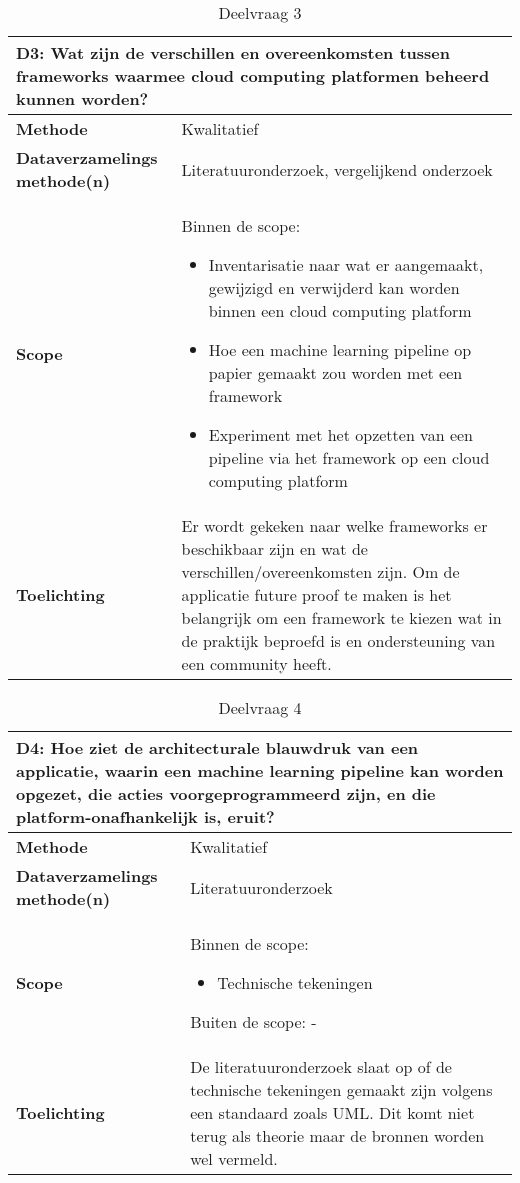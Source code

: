 {\begin{table}[hbt!]
\centering
\begin{tabular}{|p{.215\linewidth}|p{.72\linewidth}|}
\hline
\multicolumn{2}{|p{.97\linewidth}|}{\textbf{D3: Wat zijn de verschillen en overeenkomsten tussen frameworks waarmee cloud computing platformen beheerd kunnen worden?}} \\ \hline
  \textbf{Methode}&
    Kwalitatief
  \\ \hline
  \textbf{Dataverzamelings methode(n)}&
    Literatuuronderzoek, vergelijkend onderzoek
  \\ \hline
  \textbf{Scope}&
    Binnen de scope:
    \begin{itemize}
      \item Inventarisatie naar wat er aangemaakt, gewijzigd en verwijderd kan worden binnen een cloud computing platform
      \item Hoe een machine learning pipeline op papier gemaakt zou worden met een framework
      \item Experiment met het opzetten van een pipeline via het framework op een cloud computing platform
    \end{itemize}
  \\ \hline
  \textbf{Toelichting}&
  Er wordt gekeken naar welke frameworks er beschikbaar zijn en wat de verschillen/overeenkomsten zijn. Om de applicatie future proof te maken is het belangrijk om een framework te kiezen wat in de praktijk beproefd is en ondersteuning van een community heeft.
  \\ \hline
\end{tabular}
\caption{Deelvraag 3}
\label{table:sq3}
\end{table}

\space
\newpage

\begin{table}[hbt!]
\centering
\begin{tabular}{|p{.215\linewidth}|p{.72\linewidth}|}
\hline
\multicolumn{2}{|p{.97\linewidth}|}{\textbf{D4: Hoe ziet de architecturale blauwdruk van een applicatie, waarin een machine learning pipeline kan worden opgezet, die acties voorgeprogrammeerd zijn, en die platform-onafhankelijk is, eruit?}} \\ \hline
  \textbf{Methode}&
    Kwalitatief
  \\ \hline
  \textbf{Dataverzamelings methode(n)}&
    Literatuuronderzoek
  \\ \hline
  \textbf{Scope}&
    Binnen de scope:
    \begin{itemize}
      \item Technische tekeningen
    \end{itemize}
    Buiten de scope:
    -
  \\ \hline
  \textbf{Toelichting}&
    De literatuuronderzoek slaat op of de technische tekeningen gemaakt zijn volgens een standaard zoals UML. Dit komt niet terug als theorie maar de bronnen worden wel vermeld.
  \\ \hline
\end{tabular}
\caption{Deelvraag 4}
\label{table:sq4}
\end{table}

}
